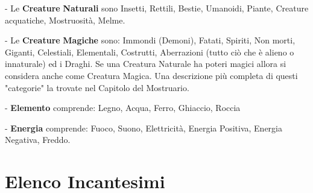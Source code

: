 \documentclass[12pt,a4paper,twoside,openany]{book}
\begin{document}
\begin{multicols}{2}
- Le \textbf{Creature} \textbf{Naturali} sono Insetti, Rettili, Bestie, Umanoidi, Piante, Creature acquatiche, Mostruosità, Melme.

- Le \textbf{Creature} \textbf{Magiche} sono: Immondi (Demoni), Fatati, Spiriti, Non morti, Giganti, Celestiali, Elementali, Costrutti, Aberrazioni (tutto ciò che è alieno o innaturale) ed i  Draghi.
Se una Creatura Naturale ha poteri magici allora si considera anche come Creatura Magica. Una descrizione più completa di questi "categorie" la trovate nel Capitolo del Mostruario.

- \textbf{Elemento} comprende: Legno, Acqua, Ferro, Ghiaccio, Roccia

- \textbf{Energia} comprende: Fuoco, Suono, Elettricità, Energia Positiva, Energia Negativa, Freddo.


\end{multicols}

\pagebreak

\section{Elenco Incantesimi}
\end{document}

